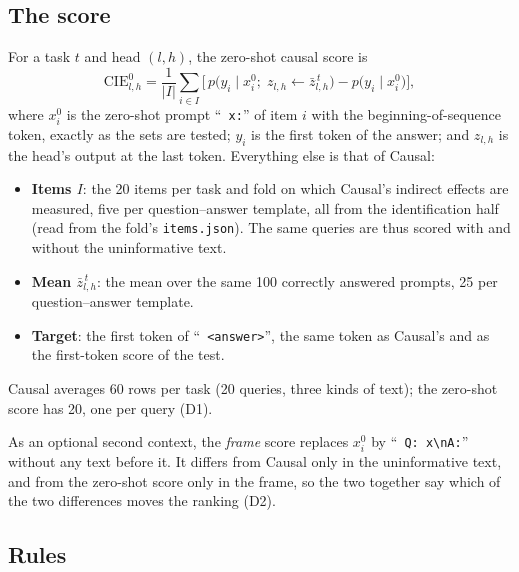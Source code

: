 \documentclass[10pt,a4paper]{article}
\newcommand{\nl}{\textbackslash n}
\newcommand{\p}[1]{``\texttt{#1}''}
\newcommand{\zbar}{\bar z}
\begin{document}
\subsection{The score}\label{sec:score}

For a task $t$ and head $(l,h)$, the zero-shot causal score is
\begin{equation}
\mathrm{CIE}^{0}_{l,h} = \frac{1}{|I|}\sum_{i\in I}\Big[\, p\big(y_i \mid x^{0}_i;\; z_{l,h}\leftarrow \zbar^{\,t}_{l,h}\big) - p\big(y_i \mid x^{0}_i\big) \Big],
\end{equation}
where $x^{0}_i$ is the zero-shot prompt \p{ x:} of item $i$ with the beginning-of-sequence token, exactly as the sets are tested; $y_i$ is the first token of the answer; and $z_{l,h}$ is the head's output at the last token. Everything else is that of Causal:
\begin{itemize}
\item \textbf{Items $I$}: the 20 items per task and fold on which Causal's indirect effects are measured, five per question--answer template, all from the identification half (read from the fold's \texttt{items.json}). The same queries are thus scored with and without the uninformative text.
\item \textbf{Mean $\zbar^{\,t}_{l,h}$}: the mean over the same 100 correctly answered prompts, 25 per question--answer template.
\item \textbf{Target}: the first token of \p{ <answer>}, the same token as Causal's and as the first-token score of the test.
\end{itemize}
Causal averages 60 rows per task (20 queries, three kinds of text); the zero-shot score has 20, one per query (D1).

As an optional second context, the \emph{frame} score replaces $x^{0}_i$ by \p{ Q: x\nl A:} without any text before it. It differs from Causal only in the uninformative text, and from the zero-shot score only in the frame, so the two together say which of the two differences moves the ranking (D2).

\subsection{Rules}\label{sec:rules}
\end{document}
